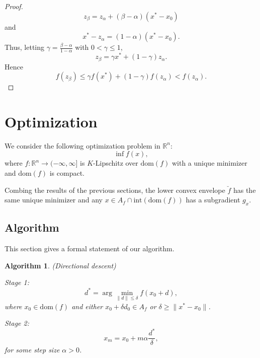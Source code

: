 \documentclass[12pt]{article}
\newtheorem{algorithm}[theorem]{Algorithm}
\begin{document}
\begin{proof}
\begin{equation*}
z_{\beta} = z_{\alpha} + (\beta - \alpha)(x^{\ast} - x_{0})
\end{equation*}
and
\begin{equation*}
x^{\ast} - z_{\alpha} = (1- \alpha)(x^{\ast} - x_{0}).
\end{equation*}
Thus, letting $\gamma = \frac{ \beta - \alpha }{ 1 - \alpha}$ with $0 < \gamma \le 1$,
\begin{equation*}
z_{\beta} = \gamma x^{\ast} + (1- \gamma) z_{\alpha}.
\end{equation*}
Hence
\begin{equation*}
f(z_{\beta})
\le \gamma f(x^{\ast}) + (1-\gamma) f(z_{\alpha})
< f(z_{\alpha}).
\end{equation*}
\end{proof}


\section{Optimization}

We consider the following optimization problem in $\mathbb{R}^{n}$:
\begin{equation*}
\inf f(x),
\end{equation*}
where $f : \mathbb{R}^{n} \rightarrow (-\infty,\infty]$ is $K$-Lipschitz over $\mathrm{dom}(f)$ with a unique minimizer and $\mathrm{dom}(f)$ is compact.

Combing the results of the previous sections, the lower convex envelope $\breve{f}$ has the same unique minimizer and any $x \in A_{f} \cap \mathrm{int}(\mathrm{dom}(f))$ has a subgradient $g_{x}$.


\subsection{Algorithm}

This section gives a formal statement of our algorithm.

\begin{algorithm}
{\rm (Directional descent)}

Stage 1:
\begin{equation*}
d^{\ast} = \arg\min_{ \lVert d \rVert \le \delta } f(x_{0} + d),  
\end{equation*}
where $x_{0} \in \mathrm{dom}(f)$ and either $x_{0} + \delta d_{0} \in A_{f}$ or $\delta \ge \lVert x^{\ast} - x_{0} \rVert$.

Stage 2:
\begin{equation*}
x_{m} = x_{0} + m \alpha \frac{ d^{\ast}}{ \delta },
\end{equation*}
for some step size $\alpha > 0$.
\end{algorithm}
\end{document}
